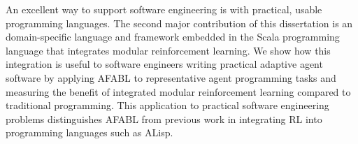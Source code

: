 \documentclass[12pt]{gatech-thesis}
\begin{document}
\begin{preliminary}
\begin{summary}
An excellent way to support software engineering is with practical, usable programming languages.  The second major contribution of this dissertation is an domain-specific language and framework embedded in the Scala programming language that integrates modular reinforcement learning.  We show how this integration is useful to software engineers writing practical adaptive agent software by applying AFABL to representative agent programming tasks and measuring the benefit of integrated modular reinforcement learning compared to traditional programming.  This application to practical software engineering problems distinguishes AFABL from previous work in integrating RL into programming languages such as ALisp.

\end{summary}

\end{preliminary}

\cleardoublepage















\appendix
\end{document}
